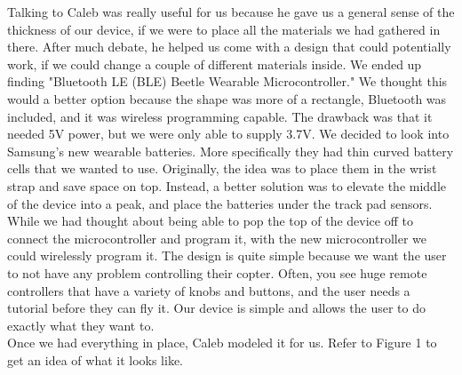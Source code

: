 \documentclass[12pt,letterpaper]{article}
\begin{document}
\hspace{1cm}Talking to Caleb was really useful for us because he gave us a general sense of the thickness of our device, if we were to place all the materials we had gathered in there. After much debate, he helped us come with a design that could potentially work, if we could change a couple of different materials inside. We ended up finding "Bluetooth LE (BLE) Beetle Wearable Microcontroller." We thought this would a better option because the shape was more of a rectangle, Bluetooth was included, and it was wireless programming capable. The drawback was that it needed 5V power, but we were only able to supply 3.7V. We decided to look into Samsung's new wearable batteries. More specifically they had thin curved battery cells that we wanted to use. Originally, the idea was to place them in the wrist strap and save space on top. Instead, a better solution was to elevate the middle of the device into a peak, and place the batteries under the track pad sensors. While we had thought about being able to pop the top of the device off to connect the microcontroller and program it, with the new microcontroller we could wirelessly program it. The design is quite simple because we want the user to not have any problem controlling their copter. Often, you see huge remote controllers that have a variety of knobs and buttons, and the user needs a tutorial before they can fly it. Our device is simple and allows the user to do exactly what they want to.\\
Once we had everything in place, Caleb modeled it for us. Refer to Figure 1 to get an idea of what it looks like.
\end{document}
